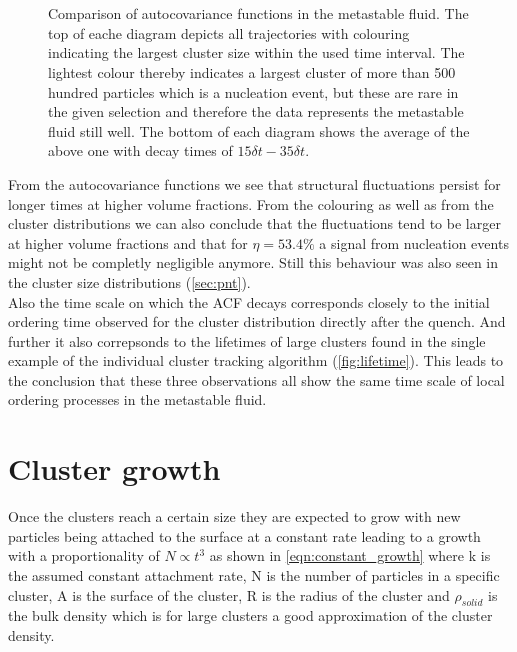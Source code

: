 \begin{figure}[ht]
\begin{center}
 \hspace{0.5cm}
 \\
 \hspace{0.5cm}
 \\
\caption[Autocovariance functions of largest cluster in the metastable fluid]{Comparison of autocovariance functions in the metastable fluid. The top of eache diagram depicts all trajectories with colouring indicating the largest cluster size within the used time interval. The lightest colour thereby indicates a largest cluster of more than 500 hundred particles which is a nucleation event, but these are rare in the given selection and therefore the data represents the metastable fluid still well. The bottom of each diagram shows the average of the above one with decay times of $ 15 \delta t- 35 \delta t$. }
\label{fig:acf}
\end{center}
\end{figure}

From the autocovariance functions we see that structural fluctuations persist for longer times at higher volume fractions. From the colouring as well as from the cluster distributions we can also conclude that the fluctuations tend to be larger at higher volume fractions and that for $\eta=53.4\%$ a signal from nucleation events might not be completly negligible anymore. Still this behaviour was also seen in the cluster size distributions (\autoref{sec:pnt}).\\
Also the time scale on which the ACF decays corresponds closely to the initial ordering time observed for the cluster distribution directly after the quench. And further it also correpsonds to the lifetimes of large clusters found in the single example of the individual cluster tracking algorithm (\autoref{fig:lifetime}). This leads to the conclusion that these three observations all show the same time scale of local ordering processes in the metastable fluid. 

\section{Cluster growth}
\label{sec:cluster_growth}
Once the clusters reach a certain size they are expected to grow with new particles being attached to the surface at a constant rate leading to a growth with a proportionality of $N \propto t^3$ as shown in \autoref{eqn:constant_growth} where k is the assumed constant attachment rate, N is the number of particles in a specific cluster, A is the surface of the cluster, R is the radius of the cluster and $\rho_{solid}$ is the bulk density which is for large clusters a good approximation of the cluster density.\\

